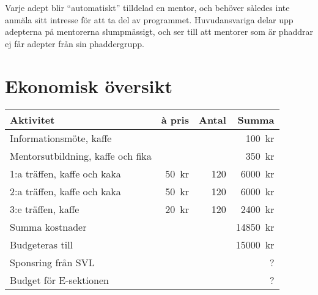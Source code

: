 \documentclass[10pt]{article}
\begin{document}
    Varje adept blir ``automatiskt'' tilldelad en mentor, och behöver således inte anmäla sitt intresse för att ta del av programmet. Huvudansvariga delar upp adepterna på mentorerna slumpmässigt, och ser till att mentorer som är phaddrar ej får adepter från sin phaddergrupp.

    \newpage

    \section{Ekonomisk översikt}
    \begin{tabularx}{\textwidth}{Xrrr}
        \textbf{Aktivitet} & \textbf{\`a pris} & \textbf{Antal} & \textbf{Summa} \\
        \hline
        Informationsmöte, kaffe & & & \SI{100}{kr} \\
        Mentorsutbildning, kaffe och fika & & & \SI{350}{kr} \\
        1:a träffen, kaffe och kaka & \SI{50}{kr} & 120 & \SI{6000}{kr} \\
        2:a träffen, kaffe och kaka & \SI{50}{kr} & 120 & \SI{6000}{kr} \\
        3:e träffen, kaffe & \SI{20}{kr} & 120 & \SI{2400}{kr} \\
        \hline
        Summa kostnader & & & \SI{14850}{kr}\\
        Budgeteras till & & & \SI{15000}{kr}\\
        Sponsring från SVL & & & ? \\
        \hline
        Budget för E-sektionen & & & ? \\
    \end{tabularx}

    \vspace*{\baselineskip}
\end{document}

